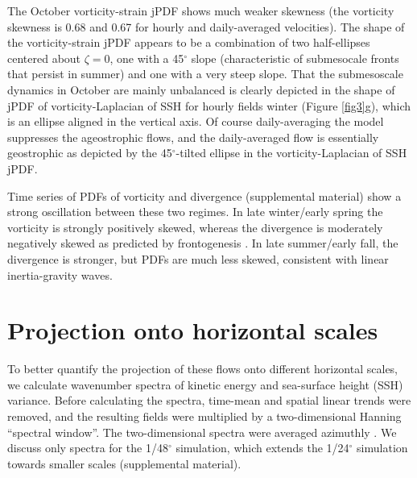 \documentclass[grl]{agutex2015}
\begin{document}
\begin{article}
The October vorticity-strain jPDF shows much weaker skewness (the vorticity skewness
is 0.68 and 0.67 for hourly and daily-averaged velocities). The shape of the
vorticity-strain jPDF  appears to be a combination of two half-ellipses centered
about $\zeta=0$, one with a 45$^\circ$ slope (characteristic of submesocale fronts
that persist in summer) and one with a very steep slope.
That the submesoscale dynamics in October are mainly unbalanced is clearly depicted
in the shape of jPDF of vorticity-Laplacian of SSH for hourly fields
winter (Figure \ref{fig3}g), which is an ellipse aligned in the vertical axis.
Of course daily-averaging the model suppresses the ageostrophic flows, and
the daily-averaged flow is essentially geostrophic as depicted by the 45$^\circ$-tilted
ellipse in the vorticity-Laplacian of SSH jPDF.

 Time series of PDFs of vorticity and divergence (supplemental material) show
 a strong oscillation between these two regimes. In late winter/early spring
 the vorticity is strongly positively skewed, whereas the divergence is moderately
 negatively skewed as predicted by frontogenesis \citep{capet_etal2008a,mcwilliams2016}
. In late summer/early fall, the divergence is stronger, but PDFs are much less skewed,
consistent with linear inertia-gravity waves.

\section{Projection onto horizontal scales}

To better quantify the projection of these flows onto different horizontal
scales, we calculate wavenumber spectra of kinetic energy and sea-surface height
(SSH) variance.  Before calculating the spectra, time-mean and spatial linear
trends were removed, and the resulting fields were multiplied by a two-dimensional Hanning ``spectral window''.
The two-dimensional spectra were averaged azimuthly \citep[e.g., ][]{rocha_etal2016} .
We discuss only spectra for the 1/48$^\circ$ simulation, which extends the 1/24$^\circ$ simulation
towards smaller scales (supplemental material).




\end{article}
\end{document}
